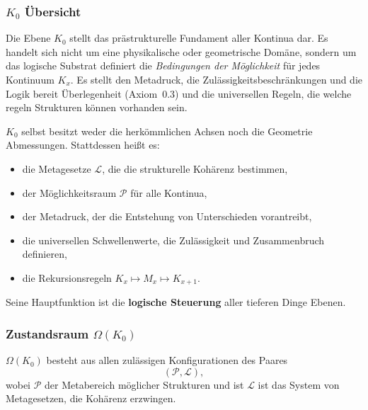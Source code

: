 

\subsubsection{\texorpdfstring{$K_0$}{K_0} Übersicht}
\label{sec:k0-overview}

Die Ebene $K_0$ stellt das prästrukturelle Fundament aller Kontinua dar.
Es handelt sich nicht um eine physikalische oder geometrische Domäne, sondern um das logische Substrat
definiert die \emph{Bedingungen der Möglichkeit} für jedes Kontinuum $K_x$.
Es stellt den Metadruck, die Zulässigkeitsbeschränkungen und die Logik bereit
Überlegenheit (Axiom~0.3) und die universellen Regeln, die welche regeln
Strukturen können vorhanden sein.

$K_0$ selbst besitzt weder die herkömmlichen Achsen noch die Geometrie
Abmessungen.
Stattdessen heißt es:
\begin{itemize}
    \item die Metagesetze $\mathcal{L}$, die die strukturelle Kohärenz bestimmen,
    \item der Möglichkeitsraum $\mathcal{P}$ für alle Kontinua,
    \item der Metadruck, der die Entstehung von Unterschieden vorantreibt,
    \item die universellen Schwellenwerte, die Zulässigkeit und Zusammenbruch definieren,
    \item die Rekursionsregeln $K_x \mapsto M_x \mapsto K_{x+1}$.
\end{itemize}

Seine Hauptfunktion ist die \textbf{logische Steuerung} aller tieferen Dinge
Ebenen.

\subsubsection{Zustandsraum \texorpdfstring{$\Omega(K_0)$}{\Omega(K_0)}}

$\Omega(K_0)$ besteht aus allen zulässigen Konfigurationen des Paares
\[
(\mathcal{P}, \mathcal{L}),
\]
wobei $\mathcal{P}$ der Metabereich möglicher Strukturen und ist
$\mathcal{L}$ ist das System von Metagesetzen, die Kohärenz erzwingen.

